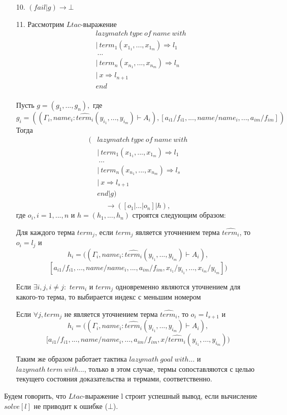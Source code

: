 \documentclass[12pt]{article}
\begin{document}
\begin{enumerate}
    \item[10.] $(fail|g) \xrightarrow{} \bot $
    \item[11.] Рассмотрим $Ltac$-выражение 
    \begin{align*}
    & lazymatch\ type\ of\ name\ with \\
    & |\ term_1 (x_{1_1}, ..., x_{1_m}) \Rightarrow l_1\\
    & \ ... \\
    & |\ term_n (x_{n_1}, ..., x_{n_m}) \Rightarrow l_n \\
    & |\ x \Rightarrow l_{n+1} \\
    & end \\
    \end{align*}
    
    Пусть $g=(g_1,...,g_n),$ где $$g_i=((\Gamma_i, name_i: \hat{term_i}(y_{i_1}, ..., y_{i_m}) \vdash A_i), [a_{i1}/f_{i1},..., name/name_i,...,a_{im}/f_{im}])$$
    Тогда 
    \begin{align*}(
    & lazymatch\ type\ of\ name\ with \\
    & |\ term_1(x_{1_1}, ..., x_{1_m}) \Rightarrow l_1\\
    & \ ... \\
    & |\ term_n(x_{n_1}, ..., x_{n_m}) \Rightarrow l_s \\
    & |\ x \Rightarrow l_{s+1} \\
    & end | g)\\
    \end{align*}
    $$\xrightarrow{} ([o_1|...| o_{n}]|h),$$ где $o_i, i=1,...,n$ и $h=(h_1,...,h_n)$ строятся следующим образом:
    \item[] Для каждого терма $term_{j}$, если $term_{j}$ является уточнением терма $\hat{term_{i}}$, то $o_i=l_j$ и 
    $$h_i=((\Gamma_i, name_i: \hat{term_i}(y_{i_1}, ..., y_{i_m}) \vdash A_i),$$ $$ [a_{i1}/f_{i1},..., name/name_i,...,a_{im}/f_{im}, x_{i_1}/y_{i_1},..., x_{i_m}/y_{i_m}])$$
    \item[] Если $\exists i,j, i \neq j:$ $term_i$ и $term_j$ одновременно являются уточнением для какого-то терма, то выбирается индекс с меньшим номером
    \item[] Если $\forall j, term_j$ не является уточнением терма $\hat{term_i}$, то $o_i=l_{s+1}$ и $$h_i=((\Gamma_i, name_i: \hat{term_i}(y_{i_1}, ..., y_{i_m}) \vdash A_i),$$ $$ [a_{i1}/f_{i1},..., name/name_i,...,a_{im}/f_{im}, x/\hat{term_i}(y_{i_1}, ..., y_{i_m}))$$

    Таким же образом работает тактика $lazymath\ goal\ with...$ и $lazymath\ term\ with...$, только в этом случае, термы сопоставляются с целью текущего состояния доказательства и термами, соответственно. 
    
\end{enumerate}
Будем говорить, что $Ltac$-выражение l строит успешный вывод, если вычисление $solve[l]$ не приводит к ошибке ($\bot$).
\end{document}
